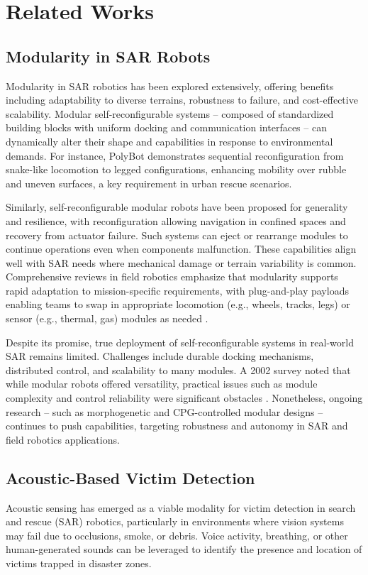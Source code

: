 \section{Related Works}

\subsection{Modularity in SAR Robots}
Modularity in SAR robotics has been explored extensively, offering benefits including adaptability to diverse terrains, robustness to failure, and cost-effective scalability. Modular self-reconfigurable systems -- composed of standardized building blocks with uniform docking and communication interfaces -- can dynamically alter their shape and capabilities in response to environmental demands. For instance, PolyBot \cite{PolyBot} demonstrates sequential reconfiguration from snake-like locomotion to legged configurations, enhancing mobility over rubble and uneven surfaces, a key requirement in urban rescue scenarios.

Similarly, self-reconfigurable modular robots have been proposed for generality and resilience, with reconfiguration allowing navigation in confined spaces and recovery from actuator failure. Such systems can eject or rearrange modules to continue operations even when components malfunction. These capabilities align well with SAR needs where mechanical damage or terrain variability is common. Comprehensive reviews in field robotics emphasize that modularity supports rapid adaptation to mission-specific requirements, with plug-and-play payloads enabling teams to swap in appropriate locomotion (e.g., wheels, tracks, legs) or sensor (e.g., thermal, gas) modules as needed \cite{ModularRobotic}.

Despite its promise, true deployment of self-reconfigurable systems in real-world SAR remains limited. Challenges include durable docking mechanisms, distributed control, and scalability to many modules. A 2002 survey \cite{wiredBots2002} noted that while modular robots offered versatility, practical issues such as module complexity and control reliability were significant obstacles \cite{}. Nonetheless, ongoing research -- such as morphogenetic and CPG-controlled modular designs \cite{CPGLocomotion} -- continues to push capabilities, targeting robustness and autonomy in SAR and field robotics applications.

\subsection{Acoustic-Based Victim Detection}
Acoustic sensing has emerged as a viable modality for victim detection in search and rescue (SAR) robotics, particularly in environments where vision systems may fail due to occlusions, smoke, or debris. Voice activity, breathing, or other human-generated sounds can be leveraged to identify the presence and location of victims trapped in disaster zones.

